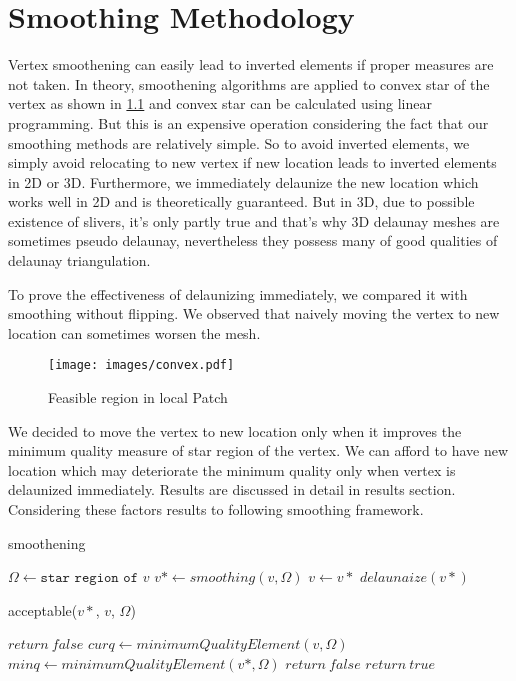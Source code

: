 \chapter{Smoothing Methodology}
Vertex smoothening can easily lead to inverted elements if proper measures are not taken. In theory, smoothening algorithms are applied to convex star of the vertex \cite{chen&xu} as shown in \ref{fig:convex} and convex star can be calculated using linear programming. But this is an expensive operation considering the fact that our smoothing methods are relatively simple. So to avoid inverted elements, we simply avoid relocating to new vertex if new location leads to inverted elements in 2D or 3D. Furthermore, we immediately delaunize the new location which works well in 2D and is theoretically guaranteed. But in 3D, due to possible existence of slivers, it's only partly true and that's why 3D delaunay meshes are sometimes pseudo delaunay, nevertheless they possess many of good qualities of delaunay triangulation.

To prove the effectiveness of delaunizing immediately, we compared it with smoothing without flipping. We observed that naively moving the vertex to new location can sometimes worsen the mesh.

\begin{figure}[h]
    \centering
    \texttt{[image: images/convex.pdf]}
    \caption{Feasible region in local Patch \cite{chen&xu}}
    \label{fig:convex}
\end{figure}


We decided to move the vertex to new location only when it improves the minimum quality measure of star region of the vertex. We can afford to have new location which may deteriorate the minimum quality only when vertex is delaunized immediately. Results are discussed in detail in results section. Considering these factors results to following smoothing framework.

\begin{algorithm}[tbh]
\caption{smoothening}
\begin{algorithmic}
		\STATE $\Omega \gets \texttt{star region of $v$}$
		\STATE $v* \gets smoothing(v, \Omega)$
			\STATE $v \gets v*$
			\STATE $delaunaize(v*)$
		\ENDIF
	\ENDFOR
\ENDWHILE
\end{algorithmic}
\end{algorithm}

\begin{algorithm}[tbh]
\caption{acceptable($v*$, $v$, $\Omega$)}
\begin{algorithmic}
	\STATE $return\ false$
\ENDIF
\STATE $curq \gets minimumQualityElement(v, \Omega)$
\STATE $minq \gets minimumQualityElement(v*, \Omega)$
	\STATE $return\ false$
\ENDIF
\STATE $return\ true$
\end{algorithmic}
\end{algorithm}

